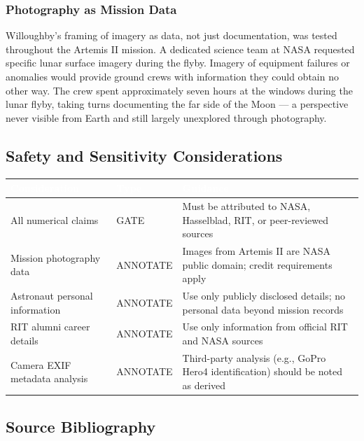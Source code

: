 \documentclass[11pt,letterpaper]{article}
\newcommand{\tableheader}[1]{\textbf{\sffamily\textcolor{white}{#1}}}
\begin{document}
\subsubsection{Photography as Mission Data}

Willoughby's framing of imagery as data, not just documentation, was tested throughout the Artemis II mission. A dedicated science team at NASA requested specific lunar surface imagery during the flyby. Imagery of equipment failures or anomalies would provide ground crews with information they could obtain no other way. The crew spent approximately seven hours at the windows during the lunar flyby, taking turns documenting the far side of the Moon --- a perspective never visible from Earth and still largely unexplored through photography.

\subsection{Safety and Sensitivity Considerations}

\begin{center}
\begin{tabularx}{\textwidth}{L{4cm}L{2.5cm}X}
\toprule
{}
\tableheader{Consideration} & \tableheader{Type} & \tableheader{Guidance} \\
\midrule
All numerical claims & GATE & Must be attributed to NASA, Hasselblad, RIT, or peer-reviewed sources \\
Mission photography data & ANNOTATE & Images from Artemis II are NASA public domain; credit requirements apply \\
Astronaut personal information & ANNOTATE & Use only publicly disclosed details; no personal data beyond mission records \\
RIT alumni career details & ANNOTATE & Use only information from official RIT and NASA sources \\
Camera EXIF metadata analysis & ANNOTATE & Third-party analysis (e.g., GoPro Hero4 identification) should be noted as derived \\
\bottomrule
\end{tabularx}
\end{center}

\subsection{Source Bibliography}
\end{document}
